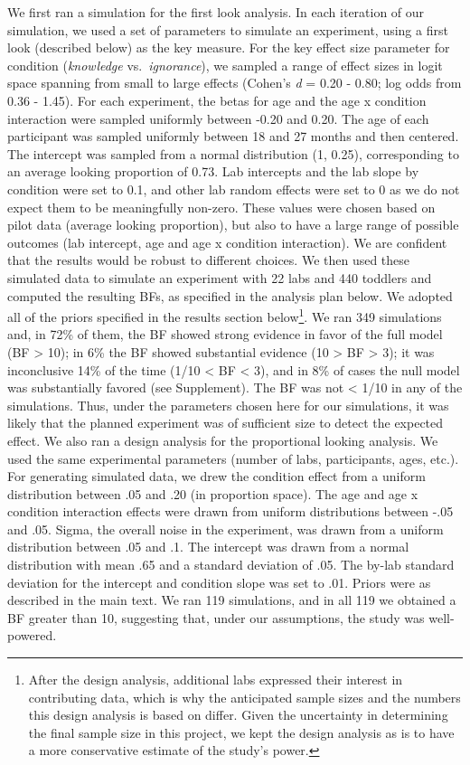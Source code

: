 \documentclass[
  man,floatsintext]{apa6}
\begin{document}
We first ran a simulation for the first look analysis. In each iteration of our simulation, we used a set of parameters to simulate an experiment, using a first look (described below) as the key measure. For the key effect size parameter for condition (\emph{knowledge} vs.~\emph{ignorance}), we sampled a range of effect sizes in logit space spanning from small to large effects (Cohen's \emph{d} = 0.20 - 0.80; log odds from 0.36 - 1.45). For each experiment, the betas for age and the age x condition interaction were sampled uniformly between -0.20 and 0.20. The age of each participant was sampled uniformly between 18 and 27 months and then centered. The intercept was sampled from a normal distribution (1, 0.25), corresponding to an average looking proportion of 0.73. Lab intercepts and the lab slope by condition were set to 0.1, and other lab random effects were set to 0 as we do not expect them to be meaningfully non-zero. These values were chosen based on pilot data (average looking proportion), but also to have a large range of possible outcomes (lab intercept, age and age x condition interaction). We are confident that the results would be robust to different choices. We then used these simulated data to simulate an experiment with 22 labs and 440 toddlers and computed the resulting BFs, as specified in the analysis plan below. We adopted all of the priors specified in the results section below\footnote{After the design analysis, additional labs expressed their interest in contributing data, which is why the anticipated sample sizes and the numbers this design analysis is based on differ. Given the uncertainty in determining the final sample size in this project, we kept the design analysis as is to have a more conservative estimate of the study's power.}. We ran 349 simulations and, in 72\% of them, the BF showed strong evidence in favor of the full model (BF \textgreater{} 10); in 6\% the BF showed substantial evidence (10 \textgreater{} BF \textgreater{} 3); it was inconclusive 14\% of the time (1/10 \textless{} BF \textless{} 3), and in 8\% of cases the null model was substantially favored (see Supplement). The BF was not \textless{} 1/10 in any of the simulations. Thus, under the parameters chosen here for our simulations, it was likely that the planned experiment was of sufficient size to detect the expected effect.
We also ran a design analysis for the proportional looking analysis. We used the same experimental parameters (number of labs, participants, ages, etc.). For generating simulated data, we drew the condition effect from a uniform distribution between .05 and .20 (in proportion space). The age and age x condition interaction effects were drawn from uniform distributions between -.05 and .05. Sigma, the overall noise in the experiment, was drawn from a uniform distribution between .05 and .1. The intercept was drawn from a normal distribution with mean .65 and a standard deviation of .05. The by-lab standard deviation for the intercept and condition slope was set to .01. Priors were as described in the main text. We ran 119 simulations, and in all 119 we obtained a BF greater than 10, suggesting that, under our assumptions, the study was well-powered.
\end{document}
